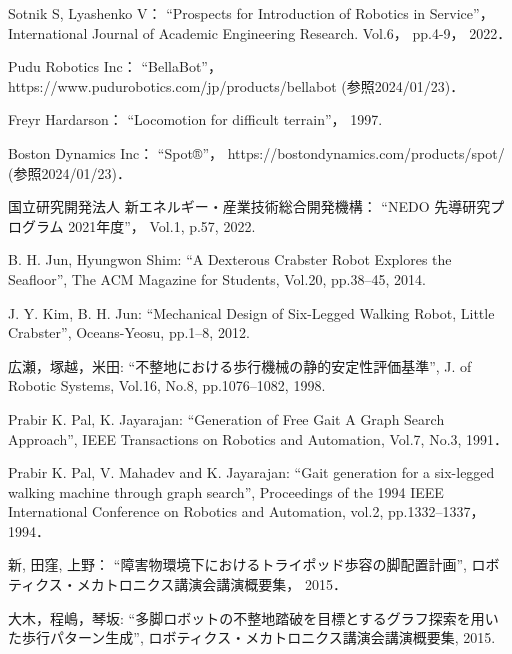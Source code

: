 ﻿\begin{thebibliography}{99}
    Sotnik S, Lyashenko V：
    ``Prospects for Introduction of Robotics in Service''，
    International Journal of Academic Engineering Research.
    Vol.6，
    pp.4-9， %
    2022．

    Pudu Robotics Inc：
    ``BellaBot''，
    https://www.pudurobotics.com/jp/products/bellabot (参照2024/01/23)．

    Freyr Hardarson：
    ``Locomotion for difficult terrain''，
    1997.

    Boston Dynamics Inc：
    ``Spot®''，
    https://bostondynamics.com/products/spot/ (参照2024/01/23)．

    国立研究開発法人 新エネルギー・産業技術総合開発機構：
    ``NEDO 先導研究プログラム 2021年度''，
    Vol.1,
    p.57, 
    2022. 

    B. H. Jun, Hyungwon Shim:
    ``A Dexterous Crabster Robot Explores the Seafloor'',
    The ACM Magazine for Students,
    Vol.20,
    pp.38--45,
    2014.

    J. Y. Kim, B. H. Jun:
    ``Mechanical Design of Six-Legged Walking Robot, Little Crabster'',
    Oceans-Yeosu,
    pp.1--8,
    2012.

    広瀬，塚越，米田: 
    ``不整地における歩行機械の静的安定性評価基準'', 
    J. of Robotic Systems,
    Vol.16, No.8, 
    pp.1076--1082,
    1998.

    Prabir K. Pal, K. Jayarajan: 
    ``Generation of Free Gait A Graph Search Approach'',
    IEEE Transactions on Robotics and Automation,
    Vol.7, No.3,
    1991．

    Prabir K. Pal, V. Mahadev and K. Jayarajan:
    ``Gait generation for a six-legged walking machine through graph search'',
    Proceedings of the 1994 IEEE International Conference on Robotics and Automation,
    vol.2,
    pp.1332--1337，
    1994．

    新, 田窪, 上野：
    ``障害物環境下におけるトライポッド歩容の脚配置計画'',
    ロボティクス・メカトロニクス講演会講演概要集，
    2015．

    大木，程嶋，琴坂: 
    ``多脚ロボットの不整地踏破を目標とするグラフ探索を用いた歩行パターン生成'', 
    ロボティクス・メカトロニクス講演会講演概要集,
    2015.   


\end{thebibliography}

